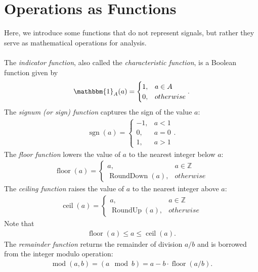 \documentclass{report}
\begin{document}
\section*{Operations as Functions}
Here, we introduce some functions that do not represent signals, but rather they serve as mathematical operations for analysis. 
\\ \\
The \emph{indicator function}, also called the \emph{characteristic function}, is a Boolean function given by 
\begin{align}
    \mathbbm{1}_A(a) = 
    \begin{cases}
        1, & a\in A \\
        0, & otherwise
    \end{cases}.
\end{align}
The \emph{signum (or sign) function} captures the sign of the value $a$: 
\begin{align}
    \operatorname{sgn}(a) = 
    \begin{cases}
        -1, & a<1 \\
        0, & a=0 \\
        1, & a>1
    \end{cases}.
\end{align}
The \emph{floor function} lowers the value of $a$ to the nearest integer below $a$:
\begin{align}
    \operatorname{floor}(a) = 
    \begin{cases}
        a, & a\in \mathbb{Z} \\
        \operatorname{RoundDown}(a), & otherwise
    \end{cases}
\end{align}
The \emph{ceiling function} raises the value of $a$ to the nearest integer above $a$:
\begin{align}
    \operatorname{ceil}(a) = 
    \begin{cases}
        a, & a\in \mathbb{Z} \\
        \operatorname{RoundUp}(a), & otherwise
    \end{cases}
\end{align}
Note that 
\begin{align}
    \operatorname{floor}(a) \leq a \leq \operatorname{ceil}(a).
\end{align}
The \emph{remainder function} returns the remainder of division $a/b$ and is borrowed from the integer modulo operation:
\begin{align}
    \operatorname{mod}(a,b) = (a \mod b) = a - b\cdot\operatorname{floor}(a/b).
\end{align}
\end{document}

